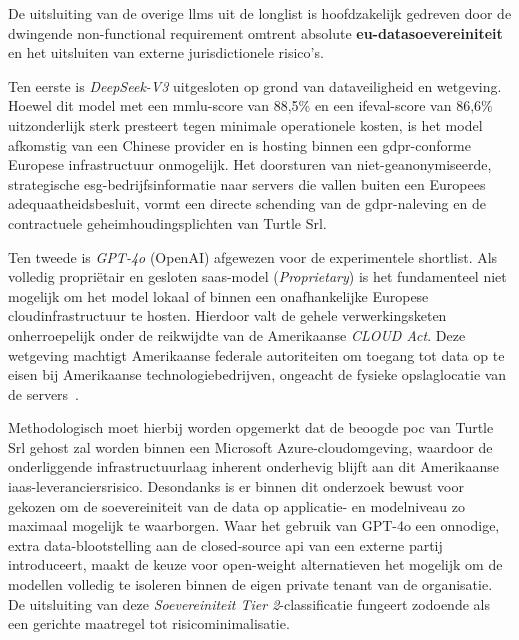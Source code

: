 De uitsluiting van de overige \glspl{llm} uit de longlist is hoofdzakelijk gedreven door de dwingende non-functional requirement omtrent absolute \textbf{\gls{eu}-datasoevereiniteit} en het uitsluiten van externe jurisdictionele risico's. 

Ten eerste is \textit{DeepSeek-V3} uitgesloten op grond van dataveiligheid en wetgeving. Hoewel dit model met een \gls{mmlu}-score van 88,5\% en een \gls{ifeval}-score van 86,6\% uitzonderlijk sterk presteert tegen minimale operationele kosten, is het model afkomstig van een Chinese provider en is hosting binnen een \gls{gdpr}-conforme Europese infrastructuur onmogelijk. Het doorsturen van niet-geanonymiseerde, strategische \gls{esg}-bedrijfsinformatie naar servers die vallen buiten een Europees adequaatheidsbesluit, vormt een directe schending van de \gls{gdpr}-naleving en de contractuele geheimhoudingsplichten van Turtle Srl.

Ten tweede is \textit{GPT-4o} (OpenAI) afgewezen voor de experimentele shortlist. Als volledig propriëtair en gesloten \gls{saas}-model (\textit{Proprietary}) is het fundamenteel niet mogelijk om het model lokaal of binnen een onafhankelijke Europese cloudinfrastructuur te hosten. Hierdoor valt de gehele verwerkingsketen onherroepelijk onder de reikwijdte van de Amerikaanse \textit{CLOUD Act}. Deze wetgeving machtigt Amerikaanse federale autoriteiten om toegang tot data op te eisen bij Amerikaanse technologiebedrijven, ongeacht de fysieke opslaglocatie van de servers~\autocite{Rutherford2019}. 

Methodologisch moet hierbij worden opgemerkt dat de beoogde \gls{poc} van Turtle Srl gehost zal worden binnen een Microsoft Azure-cloudomgeving, waardoor de onderliggende infrastructuurlaag inherent onderhevig blijft aan dit Amerikaanse \gls{iaas}-leveranciersrisico. Desondanks is er binnen dit onderzoek bewust voor gekozen om de soevereiniteit van de data op applicatie- en modelniveau zo maximaal mogelijk te waarborgen. Waar het gebruik van GPT-4o een onnodige, extra data-blootstelling aan de closed-source \gls{api} van een externe partij introduceert, maakt de keuze voor open-weight alternatieven het mogelijk om de modellen volledig te isoleren binnen de eigen private tenant van de organisatie. De uitsluiting van deze \textit{Soevereiniteit Tier 2}-classificatie fungeert zodoende als een gerichte maatregel tot risicominimalisatie.